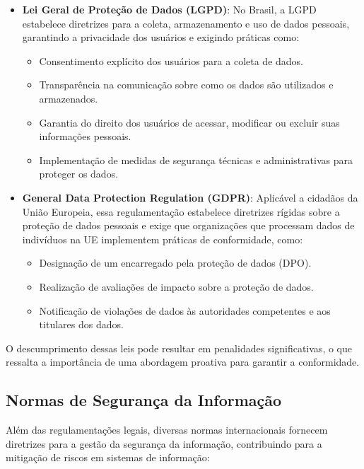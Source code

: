 \documentclass[12pt,oneside,a4paper,article]{abntex2}
\begin{document}
\begin{itemize}
    \item \textbf{Lei Geral de Proteção de Dados (LGPD)}: No Brasil, a LGPD estabelece diretrizes para a coleta, armazenamento e uso de dados pessoais, garantindo a privacidade dos usuários e exigindo práticas como:
    \begin{itemize}
        \item Consentimento explícito dos usuários para a coleta de dados.
        \item Transparência na comunicação sobre como os dados são utilizados e armazenados.
        \item Garantia do direito dos usuários de acessar, modificar ou excluir suas informações pessoais.
        \item Implementação de medidas de segurança técnicas e administrativas para proteger os dados.
    \end{itemize}

    \item \textbf{General Data Protection Regulation (GDPR)}: Aplicável a cidadãos da União Europeia, essa regulamentação estabelece diretrizes rígidas sobre a proteção de dados pessoais e exige que organizações que processam dados de indivíduos na UE implementem práticas de conformidade, como:
    \begin{itemize}
        \item Designação de um encarregado pela proteção de dados (DPO).
        \item Realização de avaliações de impacto sobre a proteção de dados.
        \item Notificação de violações de dados às autoridades competentes e aos titulares dos dados.
    \end{itemize}
\end{itemize}

O descumprimento dessas leis pode resultar em penalidades significativas, o que ressalta a importância de uma abordagem proativa para garantir a conformidade.

\subsection{Normas de Segurança da Informação}

Além das regulamentações legais, diversas normas internacionais fornecem diretrizes para a gestão da segurança da informação, contribuindo para a mitigação de riscos em sistemas de informação:
\end{document}
